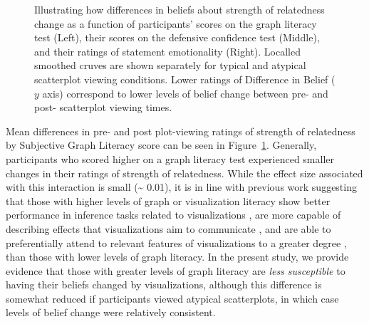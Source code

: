 \documentclass[manuscript,screen,review,anonymous]{acmart}
\begin{document}
\begin{figure}


\caption{\label{fig-add-analyses-plots}Illustrating how differences in
beliefs about strength of relatedness change as a function of
participants' scores on the graph literacy test (Left), their scores on
the defensive confidence test (Middle), and their ratings of statement
emotionality (Right). Localled smoothed cruves are shown separately for
typical and atypical scatterplot viewing conditions. Lower ratings of
Difference in Belief (\(y\) axis) correspond to lower levels of belief
change between pre- and post- scatterplot viewing times.}

\end{figure}%

Mean differences in pre- and post plot-viewing ratings of strength of
relatedness by Subjective Graph Literacy score can be seen in
Figure~\ref{fig-add-analyses-plots}. Generally, participants who scored
higher on a graph literacy test experienced smaller changes in their
ratings of strength of relatedness. While the effect size associated
with this interaction is small (\textasciitilde{} 0.01), it is in line
with previous work suggesting that those with higher levels of graph or
visualization literacy show better performance in inference tasks
related to visualizations \citep{canham_2010}, are more capable of
describing effects that visualizations aim to communicate
\citep{shah_2011}, and are able to preferentially attend to relevant
features of visualizations to a greater degree \citep{okan_2016}, than
those with lower levels of graph literacy. In the present study, we
provide evidence that those with greater levels of graph literacy are
\emph{less susceptible} to having their beliefs changed by
visualizations, although this difference is somewhat reduced if
participants viewed atypical scatterplots, in which case levels of
belief change were relatively consistent.
\end{document}
